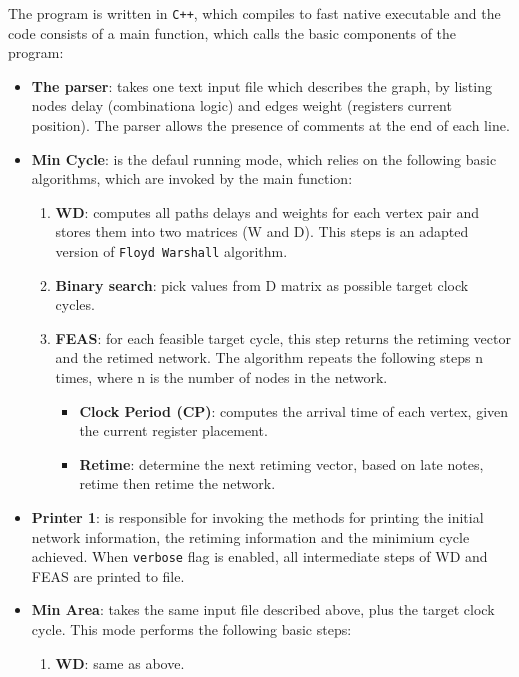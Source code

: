 \documentclass{acm_proc_article-sp}
\begin{document}
The program is written in \texttt{C++}, which compiles to fast native executable
and the code consists of a main function, which calls the basic components of
the program:
\begin{itemize}
  \item {\bf The parser}: takes  one text input file which describes the graph,
    by listing nodes delay (combinationa logic) and edges weight (registers
    current position). The parser allows the presence of comments at the end of
    each line.
  \item {\bf Min Cycle}: is the defaul running mode, which relies on the
    following basic algorithms, which are invoked by the main function:
    \begin{enumerate}
      \item {\bf WD}: computes all paths delays and weights for each vertex pair
        and stores them into two matrices (W and D). This steps is an adapted
        version of \texttt{Floyd Warshall} algorithm.
      \item {\bf Binary search}: pick values from D matrix as possible target
        clock cycles.
      \item {\bf FEAS}: for each feasible target cycle, this step returns the
        retiming vector and the retimed network. The algorithm repeats the
        following steps n times, where n is the number of nodes in the network.
        \begin {itemize}
          \item {\bf Clock Period (CP)}: computes the arrival time of each vertex, given
            the current register placement.
          \item {\bf Retime}: determine the next retiming vector, based on late
            notes, retime then retime the network.
        \end{itemize}
    \end{enumerate}
  \item {\bf Printer 1}: is responsible for invoking the methods for printing
    the initial network information, the retiming information and the minimium
    cycle achieved. When \texttt{verbose} flag is enabled, all intermediate steps
    of WD and FEAS are printed to file.
  \item {\bf Min Area}: takes the same input file described above, plus the
    target clock cycle. This mode performs the following basic steps:
    \begin{enumerate}
      \item {\bf WD}: same as above.

\end{enumerate}
\end{itemize}
\end{document}
